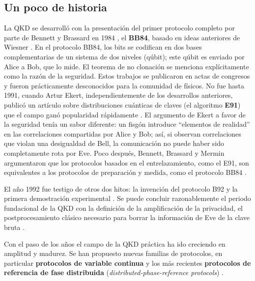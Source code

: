 \documentclass[a4paper,11pt]{book} %
\numberwithin{equation}{chapter}
\begin{document}
		
		\subsection{Un poco de historia}

La QKD se desarrolló con la presentación del primer protocolo completo por parte de Bennett y Brassard en 1984 \cite{bib_BB84}, el \textbf{BB84}, basado en ideas anteriores de Wiesner \cite{bib_BB84_Wiesner_1983}. En el protocolo BB84, los bits se codifican en dos bases complementarias de un sistema de dos niveles (qúbit); este qúbit es enviado por Alice a Bob, que lo mide. El teorema de no clonación se menciona explícitamente como la razón de la seguridad. Estos trabajos se publicaron en actas de congresos y fueron prácticamente desconocidos para la comunidad de físicos. No fue hasta 1991, cuando Artur Ekert, independientemente de los desarrollos anteriores, publicó un artículo sobre distribuciones cuánticas de claves (el algoritmo \textbf{E91}) que el campo ganó popularidad rápidamente \cite{bib_Ekert-1991}. El argumento de Ekert a favor de la seguridad tenía un sabor diferente: un fisgón introduce ``elementos de realidad'' en las correlaciones compartidas por Alice y Bob; así, si observan correlaciones que violan una desigualdad de Bell, la comunicación no puede haber sido completamente rota por Eve. Poco después, Bennett, Brassard y Mermin argumentaron que los protocolos basados en el entrelazamiento, como el E91, son equivalentes a los protocolos de preparación y medida, como el protocolo BB84  \cite{bib_BB84_E91_iguales}. 

El año 1992 fue testigo de otros dos hitos: la invención del protocolo B92 \cite{bib_B92} y la primera demostración experimental \cite{bib_experiment_QKD}. Se puede concluir razonablemente el periodo fundacional de la QKD con la definición de la amplificación de la privacidad, el postprocesamiento clásico necesario para borrar la información de Eve de la clave bruta \cite{bib_Privacy_amplification}.

Con el paso de los años el campo de la QKD práctica ha ido creciendo en amplitud y madurez. Se han propuesto nuevas familias de protocolos, en particular \textbf{protocolos de variable continua} \cite{bib_Continue_var_Ralph_1999, bib_Continue_var_Hillery_2000, bib_Continue_var_Cerf_2001, bib_Continue_var_Gottesman_2001, bib_Continue_var_Grosshans_2002, bib_Continue_var_Silberhorn_2002} y los más recientes \textbf{protocolos de referencia de fase distribuida} (\textit{distributed-phase-reference protocols}) \cite{bib_Phase_Inoue_2002, Phase_Stucki_2005}. 
\end{document}
